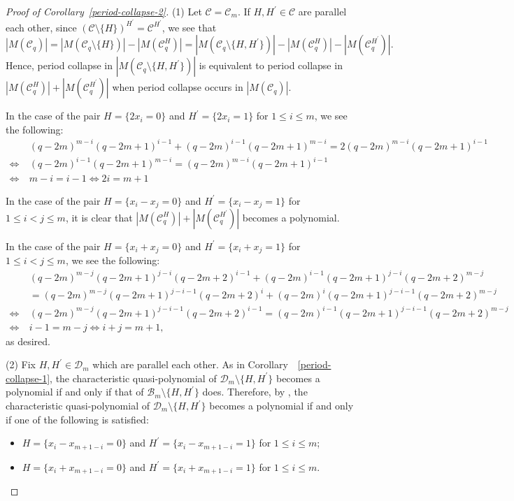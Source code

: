 \documentclass{article}
\theoremstyle{plain}
\theoremstyle{definition}
\theoremstyle{remark}
\numberwithin{equation}{section}
\newcommand{\Bc}{\mathcal{B}}
\newcommand{\Cc}{\mathcal{C}}
\newcommand{\Dc}{\mathcal{D}}
\begin{document}
\begin{proof}[Proof of Corollary~\ref{period-collapse-2}]
(1) Let $\Cc=\mathcal{C}_m$. If $H,H^{\prime} \in \Cc$ are parallel each other, 
since $(\Cc\setminus \{H\})^{H^{\prime}}=\Cc^{H^{\prime}}$, we see that \[
|M(\Cc_q)|=|M(\Cc_q\setminus \{H \})| - |M(\Cc_q^H )|=|M(\Cc_q\setminus \{H,H^{\prime}\})| - |M(\Cc_q^H)| - |M(\Cc_q^{{H^{\prime}}})|. 
\]
Hence, period collapse in $|M(\Cc_q\setminus \{H,H^{\prime}\})|$ is equivalent to period collapse in $|M(\Cc_q^{H})| + |M(\Cc_q^{H^{\prime}})|$ when period collapse occurs in $|M(\Cc_q)|$. 

In the case of the pair $H=\{2x_i=0\}$ and $H^{\prime}=\{2x_i=1\}$ for $1 \leq i \leq m$, we see the following:
\begin{align*}
    &(q-2m)^{m-i}(q-2m+1)^{i-1} + (q-2m)^{i-1}(q-2m+1)^{m-i} = 2(q-2m)^{m-i}(q-2m+1)^{i-1} \\
    \Longleftrightarrow \ &(q-2m)^{i-1}(q-2m+1)^{m-i} = (q-2m)^{m-i}(q-2m+1)^{i-1} \\
    \Longleftrightarrow \ &m-i = i-1 \Longleftrightarrow 2i = m+1
\end{align*}


In the case of the pair $H=\{x_i-x_j=0\}$ and $H^{\prime}=\{x_i-x_j=1\}$ for $1 \leq i<j \leq m$, it is clear that $|M(\Cc_q^{H})| + |M(\Cc_q^{H^{\prime}})|$ becomes a polynomial.

In the case of the pair $H=\{x_i+x_j=0\}$ and $H^{\prime}=\{x_i+x_j=1\}$ for $1 \leq i<j \leq m$, we see the following:
\begin{align*}
    &(q-2m)^{m-j}(q-2m+1)^{j-i}(q-2m+2)^{i-1} + (q-2m)^{i-1}(q-2m+1)^{j-i}(q-2m+2)^{m-j} \\
    &= (q-2m)^{m-j}(q-2m+1)^{j-i-1}(q-2m+2)^{i} + (q-2m)^{i}(q-2m+1)^{j-i-1}(q-2m+2)^{m-j} \\
    \Longleftrightarrow \ &(q-2m)^{m-j}(q-2m+1)^{j-i-1}(q-2m+2)^{i-1} = (q-2m)^{i-1}(q-2m+1)^{j-i-1}(q-2m+2)^{m-j} \\
    \Longleftrightarrow \ &i-1 = m-j \Longleftrightarrow i+j = m+1, 
\end{align*}
as desired.

\noindent
(2) Fix $H,H^{\prime} \in \Dc_m$ which are parallel each other. As in Corollary~~\ref{period-collapse-1}, the characteristic quasi-polynomial of $\Dc_m \setminus \{H,H^{\prime}\}$ becomes a polynomial if and only if that of $\Bc_m \setminus \{H,H^{\prime}\}$ does. Therefore, by \cite[Corollary 1.6]{HN2024}, the characteristic quasi-polynomial of $\Dc_m \setminus \{H,H^{\prime}\}$ becomes a polynomial if and only if one of the following is satisfied: 
\begin{itemize}
    \item $H=\{x_i-x_{m+1-i}=0\}$ and $H^{\prime}=\{x_i-x_{m+1-i}=1\}$ for $1 \leq i \leq m$; 
    \item $H=\{x_i+x_{m+1-i}=0\}$ and $H^{\prime}=\{x_i+x_{m+1-i}=1\}$ for $1 \leq i \leq m$. 
\end{itemize}
\end{proof}
\end{document}
